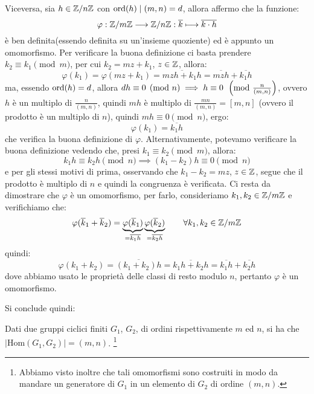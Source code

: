 \documentclass[11pt]{scrartcl}
\begin{document}
Viceversa, sia $h \in {\mathbb Z}/n{\mathbb Z}$ con $\operatorname{ord}(h)\mid (m,n)=d$, allora affermo che la funzione:
	\[ \varphi: {\mathbb Z}/m{\mathbb Z} \longrightarrow {\mathbb Z}/n{\mathbb Z} : \overline k \longmapsto \overline{k\cdot h}
	\]
è ben definita(essendo definita su un'insieme quoziente) ed è appunto un omomorfismo. Per verificare la buona definizione ci basta prendere $k_2 \equiv k_1 \pmod m$, per cui $k_2=mz+k_1$, $z \in \mathbb Z$, allora:
	\[ \varphi(k_1) = \varphi(mz+k_1) = \overline{mzh+k_1h} = \overline{mzh} + \overline{k_1h}
	\] 
ma, essendo $\operatorname{ord}(h)=d$, allora $dh \equiv 0 \pmod n \implies h \equiv 0 \myPMod{\frac{n}{(m,n)}}$, ovvero $h$ è un multiplo di $\displaystyle\frac{n}{(m,n)}$, quindi $mh$ è multiplo di $\displaystyle\frac{mn}{(m,n)} = [m,n]$ (ovvero il prodotto è un multiplo di $n$), quindi $mh \equiv 0 \pmod n$, ergo:
	\[  \varphi(k_1) = \overline{k_1h}
	\]
che verifica la buona definizione di $\varphi$. Alternativamente, potevamo verificare la buona definizione vedendo che, presi $k_1 \equiv k_2 \pmod m$, allora:
	\[ k_1h \equiv k_2h \pmod n \implies (k_1-k_2)h \equiv 0 \pmod n
	\]
e per gli stessi motivi di prima, osservando che $k_1-k_2 = mz$, $z \in \mathbb Z$, segue che il prodotto è multiplo di $n$ e quindi la congruenza è verificata. Ci resta da dimostrare che $\varphi$ è un omomorfismo, per farlo, consideriamo $k_1, k_2 \in {\mathbb Z}/m{\mathbb Z}$ e verifichiamo che:
	\[ \varphi(\overline k_1 + \overline k_2) = \underbrace{\varphi(\overline k_1)}_{=\overline{k_1h}}\underbrace{\varphi(\overline k_2)}_{=\overline{k_2h}}
	\qquad 
	\forall k_1, k_2 \in {\mathbb Z}/m{\mathbb Z}
	\]
quindi:
	\[ \varphi(k_1 + k_2) = \overline{(k_1 + k_2)h} = \overline{k_1h + k_2h} = \overline{k_1h} + \overline{k_2h}
	\]
dove abbiamo usato le proprietà delle classi di resto modulo $n$, pertanto $\varphi$ è un omomorfismo.

Si conclude quindi:
\begin{proposition}
Dati due gruppi ciclici finiti $G_1$, $G_2$, di ordini rispettivamente $m$ ed $n$, si ha che $|\text{Hom}(G_1, G_2)|=(m,n)$. \footnote{Abbiamo visto inoltre che tali omomorfismi sono costruiti in modo da mandare un generatore di $G_1$ in un elemento di $G_2$ di ordine $(m,n)$.}
\end{proposition}
\end{document}
